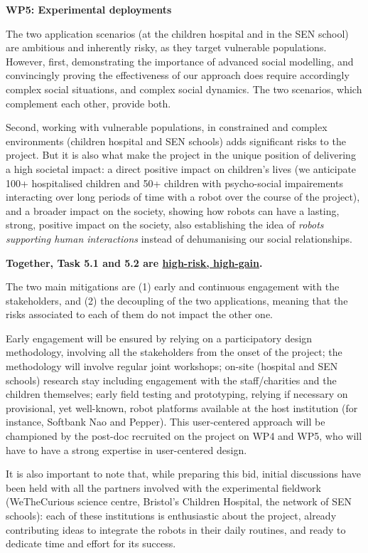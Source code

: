 \vspace{1em}

\textbf{WP5: Experimental deployments}

The two application scenarios (at the children hospital and in the SEN school)
are ambitious and inherently risky, as they target vulnerable populations.
However, first, demonstrating the importance of advanced social modelling, and
convincingly proving the effectiveness of our approach does require accordingly
complex social situations, and complex social dynamics. The two scenarios, which
complement each other, provide both.

Second, working with vulnerable populations, in constrained and complex
environments (children hospital and SEN schools) adds significant risks to the
project. But it is also what make the project in the unique position of
delivering a high societal impact: a direct positive impact on children's lives
(we anticipate 100+ hospitalised children and 50+ children with psycho-social
impairements interacting over long periods of time with a robot over the course
of the project), and a broader impact on the society, showing how robots can
have a lasting, strong, positive impact on the society, also establishing the
idea of \emph{robots supporting human interactions} instead of dehumanising our
social relationships.

\textbf{Together, Task 5.1 and 5.2 are \ul{high-risk, high-gain}.}

The two main mitigations are (1) early and continuous engagement with the
stakeholders, and (2) the decoupling of the two applications, meaning that the
risks associated to each of them do not impact the other one.

Early engagement will be ensured by relying on a participatory design
methodology, involving all the stakeholders from the onset of the project; the
methodology will involve regular joint workshops; on-site (hospital and SEN
schools) research stay including engagement with the staff/charities and the
children themselves; early field testing and prototyping, relying if necessary
on provisional, yet well-known, robot platforms available at the host
institution (for instance, Softbank Nao and Pepper). This user-centered approach
will be championed by the post-doc recruited on the project on WP4 and WP5, who will
have to have a strong expertise in user-centered design.

It is also important to note that, while preparing this bid, initial discussions
have been held with all the partners involved with the experimental fieldwork
(WeTheCurious science centre, Bristol's Children Hospital, the network of SEN
schools): each of these institutions is enthusiastic about the project, already
contributing ideas to integrate the robots in their daily routines, and
ready to dedicate time and effort for its success.


